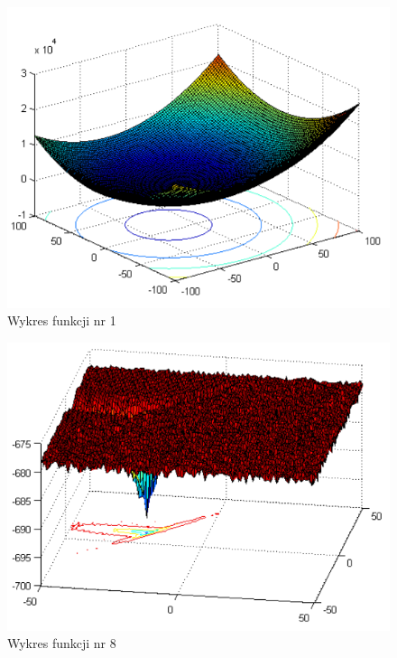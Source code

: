 \documentclass{article}
\begin{document}
\begin{figure}[H]
\centering
\includegraphics[scale=0.6]{1}
\caption{Wykres funkcji nr 1}
\end{figure}

\begin{figure}[H]
\centering
\includegraphics[scale=0.6]{8}
\caption{Wykres funkcji nr 8}
\end{figure}
\end{document}

